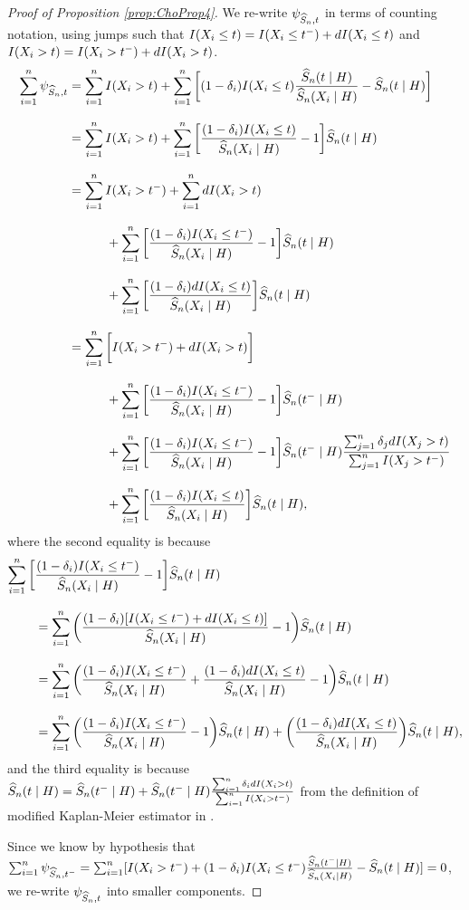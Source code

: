 {\begin{proof}[Proof of Proposition \ref{prop:ChoProp4}]
We re-write $\psi_{\widehat{S}_n,t}$ in terms of counting notation, using jumps such that $I(X_i \leq t) = I(X_i \leq t^-) + dI(X_i \leq t)$ and $I(X_i > t) = I(X_i > t^-) + dI(X_i > t)$.
\newcommand{\mkmfracj}{\frac{\sum_{j=1}^n \delta_j dI(X_j>t)}{\sum_{j=1}^n I(X_j>\leftt)}}
\begin{align*}
\sumotn \eesnht &= \sumotn \xigt + \sumotn \bigg[ \omdi \xilet \efSnhat -\Snhat\argtgH \bigg] \eqnspace
&= \sumotn \xigt + \sumotn \bigg[ \frac{\omdi \xilet}{\Snhat\argXigH} -1 \bigg] \Snhat\argtgH  \eqnspace
&= \sumotn \xigtm + \sumotn d\xigt \eqnspace 
&\quad \quad \quad +  \sumotn \bigg[ \frac{\omdi \xiletm}{\Snhat\argXigH} - 1 \bigg]\Snhat\argtgH 
 \eqnspace
&\quad \quad \quad + \sumotn \bigg[ \frac{\omdi d\xilet}{\Snhat\argXigH} \bigg]\Snhat\argtgH \eqnspace
&= \sumotn\bigg[ \xigtm + d\xigt \bigg] \eqnspace
&\quad \quad \quad + \sumotn\bigg[ \frac{\omdi \xiletm}{\Snhat\argXigH} - 1 \bigg] \Snhat\argtmgH \eqnspace
&\quad \quad \quad + \sumotn\bigg[ \frac{\omdi \xiletm}{\Snhat\argXigH} - 1 \bigg]  \Snhat\argtmgH \mkmfracj
\eqnspace
&\quad \quad \quad + \sumotn\bigg[  \frac{\omdi \xilet}{\Snhat\argXigH}\bigg] \Snhat\argtgH,
\end{align*}
where the second equality is because
\begin{align*}
\sumotn \bigg[ &\frac{\omdi \xiletm}{\Snhat\argXigH} - 1 \bigg] \Snhat\argtgH 
\eqnspace
&= \sumotn\bigg( \frac{\omdi [\xiletm + d\xilet]}{\Snhat\argXigH} - 1 \bigg)\Snhat\argtgH\eqnspace
&= \sumotn\bigg( \frac{\omdi \xiletm}{\Snhat\argXigH} 
+ \frac{\omdi d\xilet}{\Snhat\argXigH}
- 1 \bigg)\Snhat\argtgH\eqnspace
&= \sumotn\bigg( \frac{\omdi \xiletm}{\Snhat\argXigH} 
- 1 \bigg)\Snhat\argtgH
+ \bigg( \frac{\omdi d\xilet}{\Snhat\argXigH} \bigg)\Snhat\argtgH,
\end{align*}
and the third equality is because $\widehat{S}_n(t\mid H) = \widehat{S}_n (t^-\mid H) + \widehat{S}_n(t^-\mid H) \frac{\sum_{i=1}^n \delta_i dI(X_i > t)}{\sum_{i=1}^n I(X_i > t^-)}$ from the definition of modified Kaplan-Meier estimator in \cite{cho_multi-stage_2023}.

Since we know by hypothesis that $\sum_{i=1}^n \psi_{\widehat{S}_n,t^-} = \sum_{i=1}^n [I(X_i > t^-) + (1-\delta_i) I(X_i \leq t^-) \frac{\widehat{S}_n(t^-\mid H)}{\widehat{S}_n(X_i\mid H)} - \widehat{S}_n(t\mid H)]= 0$, we re-write $\psi_{\widehat{S}_n,t}$ into smaller components.


\end{proof}}
